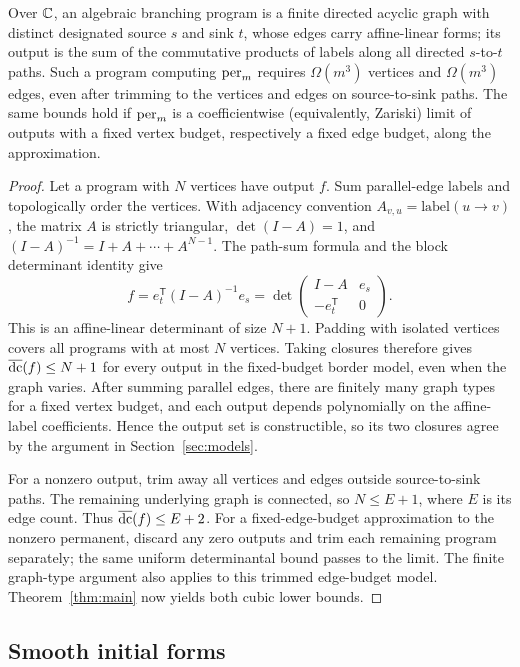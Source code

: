 \begin{corollary}
\label{cor:abp-complexity}
Over $\mathbb C$, an algebraic branching program is a finite directed acyclic
graph with distinct designated source $s$ and sink $t$, whose edges carry
affine-linear forms; its output is the sum of the commutative products of
labels along all directed $s$-to-$t$ paths. Such a program computing
$\operatorname{per}_m$ requires $\Omega(m^3)$ vertices and $\Omega(m^3)$ edges, even after
trimming to the vertices and edges on source-to-sink paths. The same
bounds hold if $\operatorname{per}_m$ is a coefficientwise (equivalently, Zariski)
limit of outputs with a fixed vertex budget, respectively a fixed edge
budget, along the approximation.
\end{corollary}
\begin{proof}
Let a program with $N$ vertices have output $f$. Sum parallel-edge labels
and topologically order the vertices. With adjacency convention
$A_{v,u}=\text{label}(u\to v)$, the matrix $A$ is strictly triangular,
$\det(I-A)=1$, and $(I-A)^{-1}=I+A+\cdots+A^{N-1}$. The path-sum formula
and the block determinant identity give
\[
 f=e_t^{\mathsf T}(I-A)^{-1}e_s
  =\det\begin{pmatrix}I-A&e_s\\-e_t^{\mathsf T}&0\end{pmatrix}.
\]
This is an affine-linear determinant of size $N+1$. Padding with isolated
vertices covers all programs with at most $N$ vertices. Taking closures
therefore gives $\operatorname{\overline{dc}}(f)\le N+1$ for every output in the fixed-budget
border model, even when the graph varies. After summing parallel edges,
there are finitely many graph types for a fixed vertex budget, and each
output depends polynomially on the affine-label coefficients. Hence the
output set is constructible, so its two closures agree by the argument
in Section~\ref{sec:models}.

For a nonzero output, trim away all vertices and edges outside
source-to-sink paths. The remaining underlying graph is connected, so
$N\le E+1$, where $E$ is its edge count. Thus $\operatorname{\overline{dc}}(f)\le E+2$.
For a fixed-edge-budget approximation to the nonzero permanent, discard
any zero outputs and trim each remaining program separately; the same
uniform determinantal bound passes to the limit. The finite graph-type
argument also applies to this trimmed edge-budget model.
Theorem~\ref{thm:main} now yields both cubic lower bounds.
\end{proof}

\subsection{Smooth initial forms}

